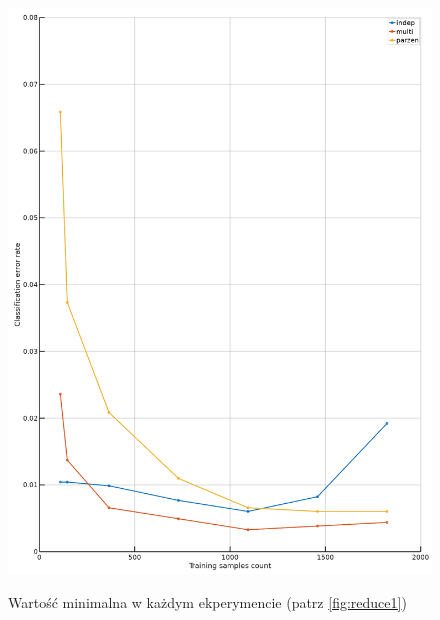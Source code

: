 \documentclass[a4paper]{article}
\begin{document}
\begin{figure}[h]
    \caption[]{Wartość minimalna w każdym ekperymencie (patrz \ref{fig:reduce1})}
    \centering
    \includegraphics[width=1.0\textwidth]{reduceMin.png}
    \label{fig:reduce2}
\end{figure}
\end{document}
